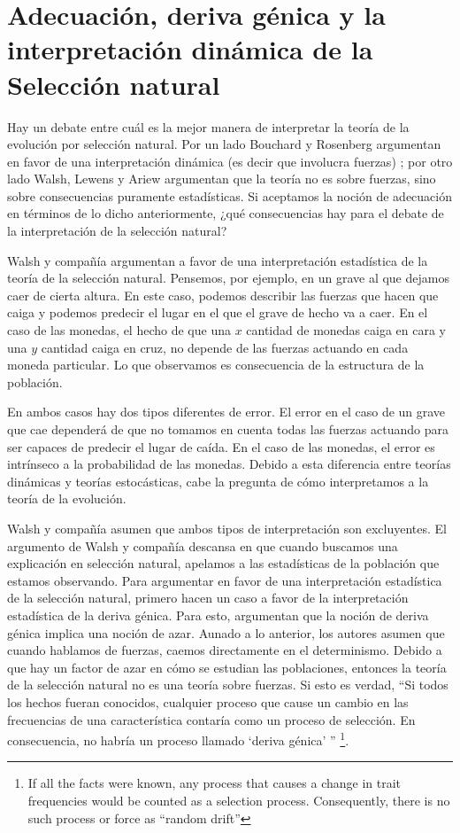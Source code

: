  \section{Adecuación, deriva génica y la interpretación dinámica de la Selección natural}

 \noindent Hay un debate entre cuál es la mejor manera de interpretar la teoría de la evolución por selección natural. Por un lado Bouchard y Rosenberg argumentan en favor de una interpretación dinámica (es decir que involucra fuerzas) \citeyear{Bouchard2004}; por otro lado Walsh, Lewens y Ariew \citeyear{Walsh2002} argumentan que la teoría no es sobre fuerzas, sino sobre consecuencias puramente estadísticas. Si aceptamos la noción de adecuación en términos de lo dicho anteriormente, ¿qué consecuencias hay para el debate de la interpretación de la selección natural?

 Walsh y compañía argumentan a favor de una interpretación estadística de la teoría de la selección natural. Pensemos, por ejemplo, en un grave al que dejamos caer de cierta altura. En este caso, podemos describir las fuerzas que hacen que caiga y podemos predecir el lugar en el que el grave de hecho va a caer. En el caso de las monedas, el hecho de que una $x$ cantidad de monedas caiga en cara y una $y$ cantidad caiga en cruz, no depende de las fuerzas actuando en cada moneda particular. Lo que observamos es consecuencia de la estructura de la población.

 En ambos casos hay dos tipos diferentes de error. El error en el caso de un grave que cae dependerá de que no tomamos en cuenta todas las fuerzas actuando para ser capaces de predecir el lugar de caída. En el caso de las monedas, el error es intrínseco a la probabilidad de las monedas. Debido a esta diferencia entre teorías dinámicas y teorías estocásticas, cabe la pregunta de cómo interpretamos a la teoría de la evolución.

 Walsh y compañía asumen que ambos tipos de interpretación son excluyentes. El argumento de Walsh y compañía descansa en que cuando buscamos una explicación en selección natural, apelamos a las estadísticas de la población que estamos observando. Para argumentar en favor de una interpretación estadística de la selección natural, primero hacen un caso a favor de la interpretación estadística de la deriva génica. Para esto, argumentan que la noción de deriva génica implica una noción de azar. Aunado a lo anterior, los autores asumen que cuando hablamos de fuerzas, caemos directamente en el determinismo. Debido a que hay un factor de azar en cómo se estudian las poblaciones, entonces la teoría de la selección natural no es una teoría sobre fuerzas. Si esto es verdad, ``Si todos los hechos fueran conocidos, cualquier proceso que cause un cambio en las frecuencias de una característica contaría como un proceso de selección. En consecuencia, no habría un proceso llamado `deriva génica' '' \citeyear[p. 457]{Walsh2002} \footnote{If all the facts were known, any process that causes a change in trait frequencies would be counted as a selection process. Consequently, there is no such process or force as ``random drift''}.

